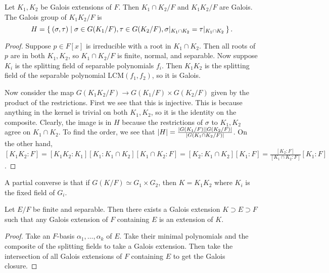 \documentclass[10pt, twoside]{article}
\begin{document}
        \begin{prop} Let $K_1, K_2$ be Galois extensions of $F$. Then $K_1 \cap
            K_2/F$ and $K_1K_2/F$ are Galois.  The Galois group of $K_1K_2/F$
            is \[H = \Set{(\sigma, \tau)| \sigma \in G(K_1/F), \tau \in
            G(K_2/F), \sigma|_{K_1\cap K_2} = \tau|_{K_1 \cap K_2}}.\]
            \begin{proof} Suppose $p \in F[x]$ is irreducible with a root in
                $K_1 \cap K_2$. Then all roots of $p$ are in both $K_1, K_2$,
                so $K_1 \cap K_2/F$ is finite, normal, and separable. Now
                suppose $K_i$ is the splitting field of separable polynomials
                $f_i$. Then $K_1K_2$ is the splitting field of the separable
                polynomial $\mathrm{LCM}(f_1, f_2)$, so it is Galois.

                Now consider the map $G(K_1K_2/F) \to G(K_1/F) \times G(K_2/F)$
            given by the product of the restrictions. First we see that this is
        injective. This is because anything in the kernel is trivial on both
    $K_1, K_2$, so it is the identity on the composite. Clearly, the image is
in $H$ because the restrictions of $\sigma$ to $K_1, K_2$ agree on $K_1 \cap
K_2$. To find the order, we see that $\lvert H\rvert =
\frac{\lvert G(K_1/F)\rvert\lvert G(K_2/F)\rvert}{\lvert G(K_1\cap K_2 / F)\rvert}$. On the other
hand, $[K_1K_2:F] = [K_1K_2:K_1][K_1:K_1 \cap K_2][K_1 \cap K_2:F] = [K_2:K_1
\cap K_2][K_1:F] = \frac{[K_2:F]}{[K_1 \cap K_2:F]}[K_1:F]$.  \end{proof}
\end{prop}

        A partial converse is that if $G(K/F) \simeq G_1 \times G_2$, then $K =
        K_1K_2$ where $K_i$ is the fixed field of $G_i$.

        \begin{cor} Let $E/F$ be finite and separable. Then there exists a
            Galois extension $K \supset E \supset F$ such that any Galois
            extension of $F$ containing $E$ is an extension of $K$.
            \begin{proof} Take an $F$-basis $\alpha_1, \ldots, \alpha_k$ of
                $E$. Take their minimal polynomials and the composite of the
                splitting fields to take a Galois extension. Then take the
                intersection of all Galois extensions of $F$ containing $E$ to
                get the Galois closure.  \end{proof} \end{cor}
\end{document}
